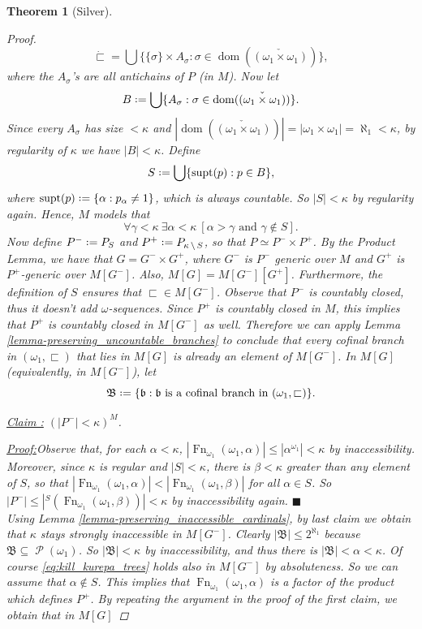 \documentclass[11pt,a4paper]{report}
\newtheorem{theorem}{Theorem}[chapter] %
\theoremstyle{definition}
\theoremstyle{num.custom-title}
\theoremstyle{custom-title}
\newenvironment{claim}[1]{\par\noindent\underline{Claim#1:}\space}{} %
\newenvironment{claimproof}[1]{\par\noindent\underline{Proof:}\space#1}{\leavevmode\unskip\penalty9999 \hbox{}\nobreak\hfill\quad\hbox{$\blacksquare$}} %
\DeclareMathOperator{\dom}{dom}
\DeclareMathOperator{\PP}{\mathcal{P}}
\DeclareMathOperator{\sm}{\setminus}
\DeclareMathOperator{\sse}{\subseteq}
\DeclareMathOperator{\Fn}{Fn}
\newcommand*{\defeq}{\mathrel{\rlap{%
                     \raisebox{0.3ex}{$\cdot$}}%
                     \raisebox{-0.3ex}{$\cdot$}}%
                     =}
\begin{document}
\begin{theorem}[Silver]
\begin{proof}
\[
\dot{\sqsubset} = 
\bigcup \big\{ \{\sigma\} \times A_\sigma : \sigma \in \dom(\check{(\omega_1 \times \omega_1)}) \big\},
\]
where the $A_\sigma$'s are all antichains of $P$ (in $M$). Now let 
\[
B \defeq \bigcup \{A_\sigma : \sigma \in \dom(\check{(\omega_1 \times \omega_1)}) \}.
\]
Since every $A_\sigma$ has size $<\kappa$ and $|\dom(\check{(\omega_1 \times \omega_1)})| = |\omega_1 \times \omega_1| = \aleph_1 < \kappa$, by regularity of $\kappa$ we have $|B| < \kappa$. Define
\[
S \defeq \bigcup \{ \supt(p) : p \in B \},
\]
where $\supt(p) \defeq \{\alpha : p_\alpha \neq 1\}$, which is always countable. So $|S| < \kappa$ by regularity again. Hence, $M$ models that
\begin{equation}\label{eq:kill_kurepa_trees}
\forall \gamma < \kappa \ \exists \alpha < \kappa \ [\alpha > \gamma \text{ and } \gamma \not\in S].
\end{equation}
Now define $P^- \defeq P_S$ and $P^+ \defeq P_{\kappa \sm S}$, so that $P \simeq P^- \times P^+$. By the Product Lemma, we have that $G = G^- \times G^+$, where $G^-$ is $P^-$ generic over $M$ and $G^+$ is $P^+$-generic over $M[G^-]$. Also, $M[G] = M[G^-][G^+]$. Furthermore, the definition of $S$ ensures that ${\sqsubset} \in M[G^-]$. Observe that $P^-$ is countably closed, thus it doesn't add $\omega$-sequences. Since $P^+$ is countably closed in $M$, this implies that $P^+$ is countably closed in $M[G^-]$ as well. Therefore we can apply Lemma \ref{lemma-preserving_uncountable_branches} to conclude that every cofinal branch in $(\omega_1,\sqsubset)$ that lies in $M[G]$ is already an element of $M[G^-]$. In $M[G]$ (equivalently, in $M[G^-]$), let
\[
\mathfrak{B} \defeq \{ \mathfrak{b} : \mathfrak{b} \text{ is a cofinal branch in } (\omega_1,\sqsubset) \}.
\]
\begin{claim}{ }
$(|P^-| < \kappa)^M$.
\begin{claimproof}
Observe that, for each $\alpha < \kappa$, $|\Fn_{\omega_1}(\omega_1,\alpha)| \leq |\alpha^{\omega_1}| < \kappa$ by inaccessibility. Moreover, since $\kappa$ is regular and $|S| < \kappa$, there is $\beta < \kappa$ greater than any element of $S$, so that $|\Fn_{\omega_1}(\omega_1,\alpha)| < |\Fn_{\omega_1}(\omega_1,\beta)|$ for all $\alpha \in S$. So $|P^-| \leq |{^S}(\Fn_{\omega_1}(\omega_1,\beta))| < \kappa$ by inaccessibility again.
\end{claimproof}
\end{claim}\\[6pt]
Using Lemma \ref{lemma-preserving_inaccessible_cardinals}, by last claim we obtain that $\kappa$ stays strongly inaccessible in $M[G^-]$. Clearly $|\mathfrak{B}| \leq 2^{\aleph_1}$ because $\mathfrak{B} \sse \PP(\omega_1)$. So $|\mathfrak{B}| < \kappa$ by inaccessibility, and thus there is $|\mathfrak{B}| < \alpha < \kappa$. Of course \eqref{eq:kill_kurepa_trees} holds also in $M[G^-]$ by absoluteness. So we can assume that $\alpha \not\in S$. This implies that $\Fn_{\omega_1} (\omega_1, \alpha)$ is a factor of the product which defines $P^+$. By repeating the argument in the proof of the first claim, we obtain that in $M[G]$

\end{proof}
\end{theorem}
\end{document}
